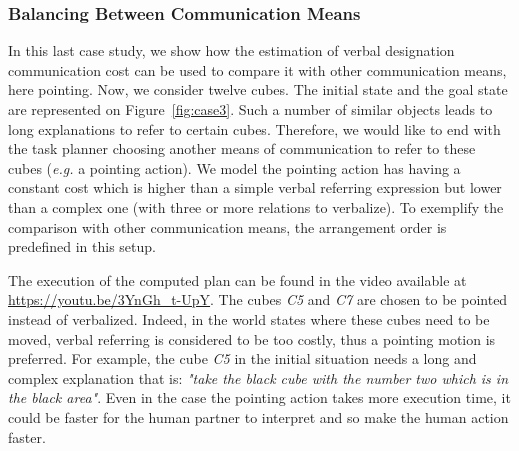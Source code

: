 \documentclass[a4paper,11pt,twoside]{StyleThese}
\begin{document}
\subsubsection{Balancing Between Communication Means}

In this last case study, we show how the estimation of verbal designation communication cost can be used to compare it with other communication means, here pointing. Now, we consider twelve cubes. The initial state and the goal state are represented on Figure~\ref{fig:case3}. Such a number of similar objects leads to long explanations to refer to certain cubes. Therefore, we would like to end with the task planner choosing another means of communication to refer to these cubes (\textit{e.g.} a pointing action). We model the pointing action has having a constant cost which is higher than a simple verbal referring expression but lower than a complex one (with three or more relations to verbalize). To exemplify the comparison with other communication means, the arrangement order is predefined in this setup. %


The execution of the computed plan can be found in the video available at \url{https://youtu.be/3YnGh\_t-UpY}. The cubes \textit{C5} and \textit{C7} are chosen to be pointed instead of verbalized. Indeed, in the world states where these cubes need to be moved, verbal referring is considered to be too costly, thus a pointing motion is preferred. For example, the cube \textit{C5} in the initial situation needs a long and complex explanation that is: \textit{"take the black cube with the number two which is in the black area"}. Even in the case the pointing action takes more execution time, it could be faster for the human partner to interpret and so make the human action faster.
\end{document}
